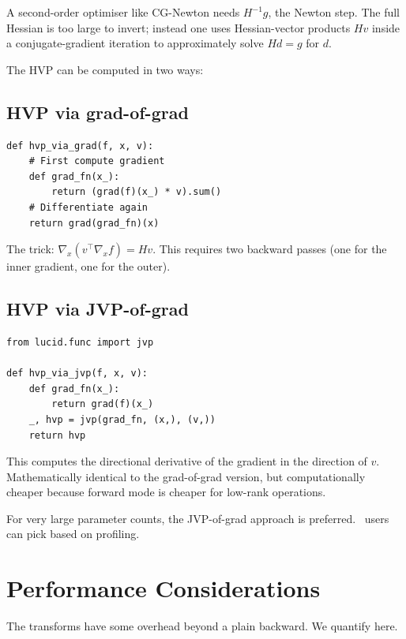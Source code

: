 A second-order optimiser like CG-Newton needs $H^{-1} g$, the
Newton step. The full Hessian is too large to invert; instead one
uses Hessian-vector products $H v$ inside a conjugate-gradient
iteration to approximately solve $H d = g$ for $d$.

The HVP can be computed in two ways:

\subsection{HVP via grad-of-grad}
\label{ssec:higher_order:hvp_double_grad}

\begin{lstlisting}[style=lucid,language=LucidPython]
def hvp_via_grad(f, x, v):
    # First compute gradient
    def grad_fn(x_):
        return (grad(f)(x_) * v).sum()
    # Differentiate again
    return grad(grad_fn)(x)
\end{lstlisting}

The trick: $\nabla_x (v^\top \nabla_x f) = H v$. This requires
two backward passes (one for the inner gradient, one for the
outer).

\subsection{HVP via JVP-of-grad}
\label{ssec:higher_order:hvp_jvp_grad}

\begin{lstlisting}[style=lucid,language=LucidPython]
from lucid.func import jvp

def hvp_via_jvp(f, x, v):
    def grad_fn(x_):
        return grad(f)(x_)
    _, hvp = jvp(grad_fn, (x,), (v,))
    return hvp
\end{lstlisting}

This computes the directional derivative of the gradient in the
direction of $v$. Mathematically identical to the grad-of-grad
version, but computationally cheaper because forward mode is
cheaper for low-rank operations.

For very large parameter counts, the JVP-of-grad approach is
preferred. \Lucid\ users can pick based on profiling.

\section{Performance Considerations}
\label{sec:higher_order:perf}

The transforms have some overhead beyond a plain backward. We
quantify here.


